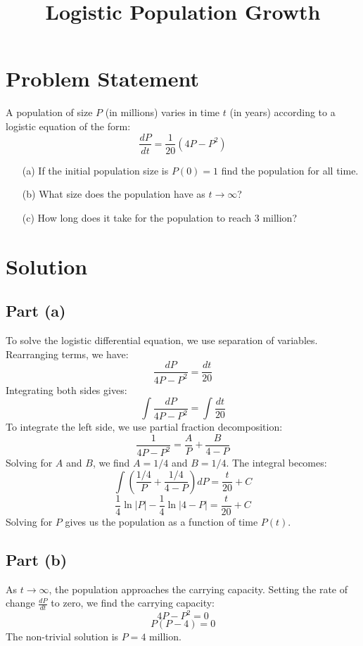 \documentclass{article}
\begin{document}
\title{Logistic Population Growth}
\date{}
\maketitle

\section*{Problem Statement}
A population of size \( P \) (in millions) varies in time \( t \) (in years) according to a logistic equation of the form:
\[ \frac{dP}{dt} = \frac{1}{20}(4P - P^2) \]

\begin{enumerate}
    \item[(a)] If the initial population size is \( P(0) = 1 \) find the population for all time.
    \item[(b)] What size does the population have as \( t \to \infty \)?
    \item[(c)] How long does it take for the population to reach 3 million?
\end{enumerate}

\section*{Solution}
\subsection*{Part (a)}
To solve the logistic differential equation, we use separation of variables. Rearranging terms, we have:
\[ \frac{dP}{4P - P^2} = \frac{dt}{20} \]
Integrating both sides gives:
\[ \int \frac{dP}{4P - P^2} = \int \frac{dt}{20} \]
To integrate the left side, we use partial fraction decomposition:
\[ \frac{1}{4P - P^2} = \frac{A}{P} + \frac{B}{4 - P} \]
Solving for \( A \) and \( B \), we find \( A = 1/4 \) and \( B = 1/4 \). The integral becomes:
\[ \int \left( \frac{1/4}{P} + \frac{1/4}{4 - P} \right) dP = \frac{t}{20} + C \]
\[ \frac{1}{4}\ln{|P|} - \frac{1}{4}\ln{|4 - P|} = \frac{t}{20} + C \]
Solving for \( P \) gives us the population as a function of time \( P(t) \).

\subsection*{Part (b)}
As \( t \to \infty \), the population approaches the carrying capacity. Setting the rate of change \( \frac{dP}{dt} \) to zero, we find the carrying capacity:
\[ 4P - P^2 = 0 \]
\[ P(P - 4) = 0 \]
The non-trivial solution is \( P = 4 \) million.
\end{document}
